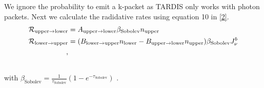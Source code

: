 \documentclass[letterpaper,10pt,english]{sphinxmanual}
\begin{document}
We ignore the probability to emit a k-packet as TARDIS only works with photon packets.
Next we calculate the radidative
rates using equation 10 in {\hyperref[zreferences:a-a-403-261l]{{[}2{]}}}.
\begin{gather}
\begin{split}{\cal R}_{\textrm{upper}\rightarrow\textrm{lower}} &=
A_{\textrm{upper}\rightarrow\textrm{lower}}\beta_\textrm{Sobolev}n_\textrm{upper}\\
{\cal R}_{\textrm{lower}\rightarrow\textrm{upper}} &=
(B_{\textrm{lower}\rightarrow\textrm{upper}}n_\textrm{lower}-
B_{\textrm{upper}\rightarrow\textrm{lower}}n_\textrm{upper})
\beta_\textrm{Sobolev} J_{\nu}^{b}\\,\end{split}\notag\\\begin{split}\end{split}\notag
\end{gather}
with $\beta_\textrm{Sobolev} = \frac{1}{\tau_\textrm{Sobolev}}(1-e^{-\tau_\textrm{Sobolev}})$ .
\end{document}
